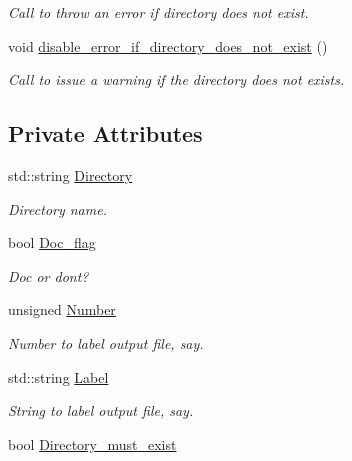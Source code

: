 \begin{DoxyCompactItemize}
\begin{DoxyCompactList}\small\item\em Call to throw an error if directory does not exist. \end{DoxyCompactList}\item 
void \hyperlink{classoomph_1_1DocInfo_a7915567faf97d45702173ed2ee3ab471}{disable\+\_\+error\+\_\+if\+\_\+directory\+\_\+does\+\_\+not\+\_\+exist} ()
\begin{DoxyCompactList}\small\item\em Call to issue a warning if the directory does not exists. \end{DoxyCompactList}\end{DoxyCompactItemize}
\subsection*{Private Attributes}
\begin{DoxyCompactItemize}
\item 
std\+::string \hyperlink{classoomph_1_1DocInfo_a9538155b259c6b8f491b1cd49f9f055e}{Directory}
\begin{DoxyCompactList}\small\item\em Directory name. \end{DoxyCompactList}\item 
bool \hyperlink{classoomph_1_1DocInfo_a23ed6ad5b2eab46c918155b79c03e098}{Doc\+\_\+flag}
\begin{DoxyCompactList}\small\item\em Doc or don\textquotesingle{}t? \end{DoxyCompactList}\item 
unsigned \hyperlink{classoomph_1_1DocInfo_a184ec7b9fb261d77014f5203c8dbef75}{Number}
\begin{DoxyCompactList}\small\item\em Number to label output file, say. \end{DoxyCompactList}\item 
std\+::string \hyperlink{classoomph_1_1DocInfo_ad2bbc402589152ebb55c448a6272f469}{Label}
\begin{DoxyCompactList}\small\item\em String to label output file, say. \end{DoxyCompactList}\item 
bool \hyperlink{classoomph_1_1DocInfo_a3ff79aa3d627c27a94404607952d768c}{Directory\+\_\+must\+\_\+exist}
\end{DoxyCompactItemize}


